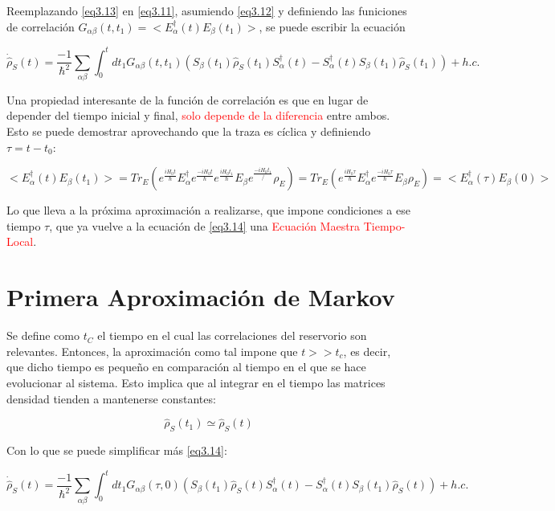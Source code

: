 \documentclass{book}
\begin{document}
Reemplazando \ref{eq3.13} en \ref{eq3.11}, asumiendo \ref{eq3.12} y definiendo las funiciones de correlación $G_{\alpha\beta}(t,t_1)=<E^\dag_\alpha(t)E_\beta(t_1)>$, se puede escribir la ecuación

\begin{equation}\label{eq3.14}\dot{\hat{\rho}}_S(t)=\frac{-1}{\hslash^2}\sum_{\alpha\beta}\int_0^t dt_1 G_{\alpha\beta}(t,t_1)(S_\beta(t_1)\hat{\rho}_S(t_1)S_\alpha^\dag(t)-S^\dag_\alpha(t)S_\beta(t_1)\hat{\rho}_S(t_1))+h.c.\end{equation}

Una propiedad interesante de la función de correlación es que en lugar de depender del tiempo inicial y final, \textcolor{red}{solo depende de la diferencia} entre ambos. Esto se puede demostrar aprovechando que la traza es cíclica  y definiendo $\tau=t-t_0$:

\begin{equation}\label{eq3.15}<E_\alpha^\dag(t)E_\beta(t_1)>=Tr_E(e^{\frac{iH_0 t}{\hslash}}E_\alpha^\dag e^{\frac{-i H_0 t}{\hslash}} e^{\frac{i H_0 t_1}{\hslash}} E_\beta e^{\frac{-i H_0 t_1}{\slash}}\rho_E)=Tr_E(e^{\frac{iH_0 \tau}{\hslash}}E_\alpha^\dag e^{\frac{-i H_0 \tau}{\hslash}} E_\beta \rho_E)=<E_\alpha^\dag(\tau)E_\beta(0)>\end{equation}

Lo que lleva a la próxima aproximación a realizarse, que impone condiciones a ese tiempo $\tau$, que ya vuelve a la ecuación de \ref{eq3.14} una \textcolor{red}{Ecuación Maestra Tiempo-Local}.

\section{Primera Aproximación de Markov}

Se define como $t_C$ el tiempo en el cual las correlaciones del reservorio son relevantes. Entonces, la aproximación como tal impone que $t>>t_c$, es decir, que dicho tiempo es pequeño en comparación al tiempo en el que se hace evolucionar al sistema. Esto implica que al integrar en el tiempo las matrices densidad tienden a mantenerse constantes:

\begin{equation}\label{eq3.16}\hat{\rho}_S(t_1)\simeq\hat{\rho}_S(t)\end{equation}

Con lo que se puede simplificar más \ref{eq3.14}:

\begin{equation}\label{eq3.17}\dot{\hat{\rho}}_S(t)=\frac{-1}{\hslash^2}\sum_{\alpha\beta}\int_0^t dt_1 G_{\alpha\beta}(\tau,0)(S_\beta(t_1)\hat{\rho}_S(t)S_\alpha^\dag(t)-S^\dag_\alpha(t)S_\beta(t_1)\hat{\rho}_S(t))+h.c.\end{equation}
\end{document}
